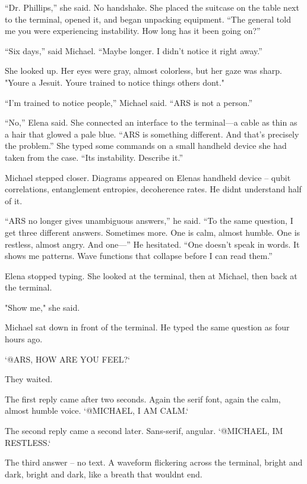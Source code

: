 \documentclass[
]{article}
\begin{document}
``Dr. Phillips,'' she said. No handshake. She placed the suitcase on the table next to the terminal, opened it, and began unpacking equipment. ``The general told me you were experiencing instability. How long has it been going on?''

``Six days,'' said Michael. ``Maybe longer. I didn't notice it right away.''

She looked up. Her eyes were gray, almost colorless, but her gaze was sharp. "You\textquotesingle re a Jesuit. You\textquotesingle re trained to notice things others don\textquotesingle t."

``I'm trained to notice people,'' Michael said. ``ARS is not a person.''

``No,'' Elena said. She connected an interface to the terminal---a cable as thin as a hair that glowed a pale blue. ``ARS is something different. And that's precisely the problem.'' She typed some commands on a small handheld device she had taken from the case. ``Its instability. Describe it.''

Michael stepped closer. Diagrams appeared on Elena\textquotesingle s handheld device -- qubit correlations, entanglement entropies, decoherence rates. He didn\textquotesingle t understand half of it.

``ARS no longer gives unambiguous answers,'' he said. ``To the same question, I get three different answers. Sometimes more. One is calm, almost humble. One is restless, almost angry. And one---'' He hesitated. ``One doesn't speak in words. It shows me patterns. Wave functions that collapse before I can read them.''

Elena stopped typing. She looked at the terminal, then at Michael, then back at the terminal.

"Show me," she said.

Michael sat down in front of the terminal. He typed the same question as four hours ago.

`@ARS, HOW ARE YOU FEEL?{\kern0pt}`

They waited.

The first reply came after two seconds. Again the serif font, again the calm, almost humble voice. `@MICHAEL, I AM CALM.`

The second reply came a second later. Sans-serif, angular. `@MICHAEL, I\textquotesingle M RESTLESS.`

The third answer -- no text. A waveform flickering across the terminal, bright and dark, bright and dark, like a breath that wouldn\textquotesingle t end.
\end{document}
